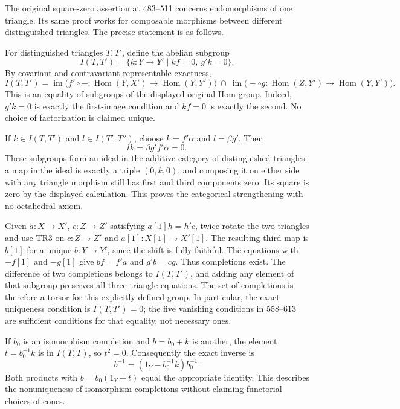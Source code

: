 The original square-zero assertion at 483–\allowbreak{}511 concerns endomorphisms of one triangle. Its same proof works for composable morphisms between different distinguished triangles. The precise statement is as follows.

For distinguished triangles \(T,T'\),\allowbreak{} define the abelian subgroup \[
I(T,T')=\{k:Y\to Y'\mid kf=0,\ g'k=0\}.
\] By covariant and contravariant representable exactness,\allowbreak{} \[
I(T,T')=
\operatorname{im}\bigl(f'\circ-:\operatorname{Hom}(Y,X')
\to\operatorname{Hom}(Y,Y')\bigr)
\ \cap\
\operatorname{im}\bigl(-\circ g:\operatorname{Hom}(Z,Y')
\to\operatorname{Hom}(Y,Y')\bigr).
\] This is an equality of subgroups of the displayed original Hom group. Indeed,\allowbreak{} \(g'k=0\) is exactly the first-image condition and \(kf=0\) is exactly the second. No choice of factorization is claimed unique.

If \(k\in I(T,T')\) and \(l\in I(T',T'')\),\allowbreak{} choose \(k=f'\alpha\) and \(l=\beta g'\). Then \[
lk=\beta g'f'\alpha=0.
\] These subgroups form an ideal in the additive category of distinguished triangles:\allowbreak{} a map in the ideal is exactly a triple \((0,k,0)\),\allowbreak{} and composing it on either side with any triangle morphism still has first and third components zero. Its square is zero by the displayed calculation. This proves the categorical strengthening with no octahedral axiom.

Given \(a:X\to X'\),\allowbreak{} \(c:Z\to Z'\) satisfying \(a[1]h=h'c\),\allowbreak{} twice rotate the two triangles and use TR3 on \(c:Z\to Z'\) and \(a[1]:X[1]\to X'[1]\). The resulting third map is \(b[1]\) for a unique \(b:Y\to Y'\),\allowbreak{} since the shift is fully faithful. The equations with \(-f[1]\) and \(-g[1]\) give \(bf=f'a\) and \(g'b=cg\). Thus completions exist. The difference of two completions belongs to \(I(T,T')\),\allowbreak{} and adding any element of that subgroup preserves all three triangle equations. The set of completions is therefore a torsor for this explicitly defined group. In particular,\allowbreak{} the exact uniqueness condition is \(I(T,T')=0\); the five vanishing conditions in 558–\allowbreak{}613 are sufficient conditions for that equality,\allowbreak{} not necessary ones.

If \(b_0\) is an isomorphism completion and \(b=b_0+k\) is another,\allowbreak{} the element \(t=b_0^{-1}k\) is in \(I(T,T)\),\allowbreak{} so \(t^2=0\). Consequently the exact inverse is \[
b^{-1}=(1_Y-b_0^{-1}k)b_0^{-1}.
\] Both products with \(b=b_0(1_Y+t)\) equal the appropriate identity. This describes the nonuniqueness of isomorphism completions without claiming functorial choices of cones.

